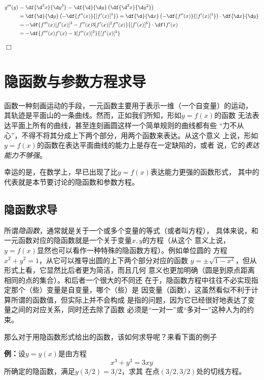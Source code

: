 \begin{align*}
	g'''(y)
	&=\df{\d^3 x}{\d y^3}
	=\df{\d }{\d y}\left(\df{\d^2 x}{\d y^2}\right)\\
	&=\df{\d }{\d y}\left(-\df{f''(x)}{[f'(x)]^3}\right)
	=\df{\d }{\d x}\left(-\df{f''(x)}{[f'(x)]^3}\right)
	\cdot\df{\d x}{\d y}\\
	&=-\df{f'''(x)[f'(x)]^3-f''(x)3[f'(x)]^2f''(x)}{[f'(x)]^6}
	\cdot\df1{f'(x)}\\
	&=-\df{f'''(x)f'(x)-3[f''(x)]^2}{[f'(x)]^5}
\end{align*}
\hfill$\Box$

\section{隐函数与参数方程求导}

函数一种刻画运动的手段，一元函数主要用于表示一维（一个自变量）的运动，
其轨迹是平面山的一条曲线。然而，正如我们所知，形如$y=f(x)$的函数
无法表达平面上所有的曲线，甚至连刻画圆这样一个简单规则的曲线都有些
“力不从心”，不得不将其分成上下两个部分，用两个函数来表达。从这个意义
上说，形如$y=f(x)$的函数在表达平面曲线的能力上是存在一定缺陷的，或者
说，它的{\it 表达能力不够强}。

幸运的是，在数学上，早已出现了比$y=f(x)$表达能力更强的函数形式，
其中的代表就是本节要讨论的隐函数和参数方程。

\subsection{隐函数求导}

所谓{\it 隐函数}，通常就是关于一个或多个变量的等式（或者叫方程），
具体来说，和一元函数对应的隐函数就是一个关于变量$x,y$的方程（从这个
意义上说，$y=f(x)$显然也可以看作一种特殊的隐函数方程）。例如单位圆的
方程$x^2+y^2=1$，从它可以推导出圆的上下两个部分对应的函数
$y=\pm\sqrt{1-x^2}$，但从形式上看，它显然比后者更为简洁，而且几何
意义也更加明确（圆是到原点距离相同的点的集合）。和后者一个很大的不同还
在于，隐函数方程中往往不必实现指定那个（些）变量是自变量，哪个（些）是
因变量（函数），这虽然看似不利于计算所谓的函数值，但实际上并不会构成
是指的问题，因为它已经很好地表达了变量之间的对应关系，同时还去除了函数
必须是“一对一”或“多对一”这种人为的约束。

那么对于用隐函数形式给出的函数，该如何求导呢？来看下面的例子

{\bf 例：}设$y=y(x)$是由方程
$$x^3+y^3=3xy$$
所确定的隐函数，满足$y(3/2)=3/2$，求其
在点$(3/2,3/2)$处的切线方程。

